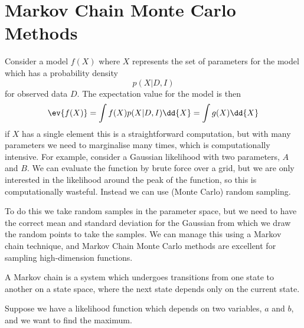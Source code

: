 \documentclass{dwnotes}         		        %
\begin{document}
\section{Markov Chain Monte Carlo Methods}
\label{sec:markov-chain-monte}

Consider a model $f(X)$ where $X$ represents the set of parameters for
the model which has a probability density
\[ p(X | D, I) \] for observed data $D$.
The expectation value for the model is then
\[ \ev{f(X)} = \int f(X) p(X|D,I) \dd{X} = \int g(X) \dd{X} \] if $X$
has a single element this is a straightforward computation, but with
many parameters we need to marginalise many times, which is
computationally intensive. For example, consider a Gaussian likelihood
with two parameters, $A$ and $B$. We can evaluate the function by
brute force over a grid, but we are only interested in the likelihood
around the peak of the function, so this is computationally
wasteful. Instead we can use (Monte Carlo) random sampling.

To do this we take random samples in the parameter space, but we need
to have the correct mean and standard deviation for the Gaussian from
which we draw the random points to take the samples. We can manage
this using a Markov chain technique, and Markov Chain Monte Carlo
methods are excellent for sampling high-dimension functions.

A Markov chain is a system which undergoes transitions from one state
to another on a state space, where the next state depends only on the
current state.

Suppose we have a likelihood function which depends on two variables,
$a$ and $b$, and we want to find the maximum.
\end{document}
